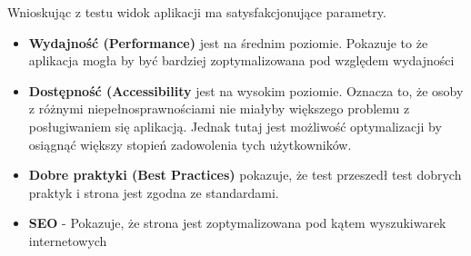 Wnioskując z testu widok aplikacji ma satysfakcjonujące parametry.
\begin{itemize}
\item \textbf{Wydajność (Performance)} jest na średnim poziomie. Pokazuje to że aplikacja mogła by być bardziej zoptymalizowana pod względem wydajności
\item \textbf{Dostępność (Accessibility} jest na wysokim poziomie. Oznacza to, że osoby z różnymi niepełnosprawnościami nie miałyby większego problemu z posługiwaniem się aplikacją. Jednak tutaj jest możliwość optymalizacji by osiągnąć większy stopień zadowolenia tych użytkowników.
\item \textbf{Dobre praktyki (Best Practices)} pokazuje, że test przeszedł test dobrych praktyk i strona jest zgodna ze standardami.
\item \textbf{SEO} - Pokazuje, że strona jest zoptymalizowana pod kątem wyszukiwarek internetowych
\end{itemize}

